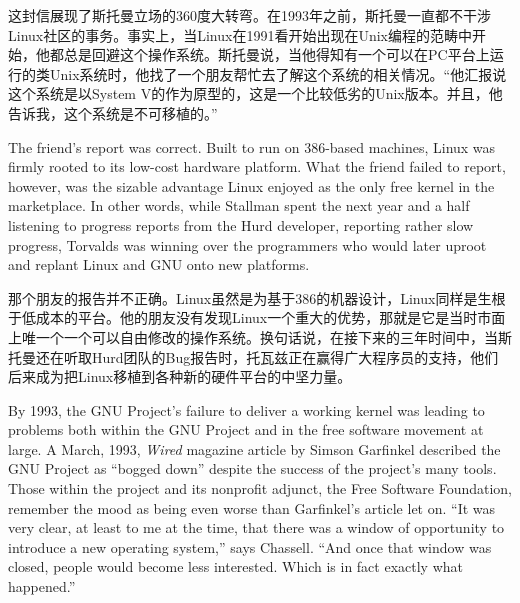 \ifdefined\chs
这封信展现了斯托曼立场的360度大转弯。在1993年之前，斯托曼一直都不干涉Linux社区的事务。事实上，当Linux在1991看开始出现在Unix编程的范畴中开始，他都总是回避这个操作系统。斯托曼说，当他得知有一个可以在PC平台上运行的类Unix系统时，他找了一个朋友帮忙去了解这个系统的相关情况。``他汇报说这个系统是以System V的作为原型的，这是一个比较低劣的Unix版本。并且，他告诉我，这个系统是不可移植的。''
\fi

\ifdefined\eng
The friend's report was correct. Built to run on 386-based machines, Linux was firmly rooted to its low-cost hardware platform. What the friend failed to report, however, was the sizable advantage Linux enjoyed as the only free kernel in the marketplace. In other words, while Stallman spent the next year and a half listening to progress reports from the Hurd developer, reporting rather slow progress, Torvalds was winning over the programmers who would later uproot and replant Linux and GNU onto new platforms.
\fi

\ifdefined\chs
那个朋友的报告并不正确。Linux虽然是为基于386的机器设计，Linux同样是生根于低成本的平台。他的朋友没有发现Linux一个重大的优势，那就是它是当时市面上唯一个一个可以自由修改的操作系统。换句话说，在接下来的三年时间中，当斯托曼还在听取Hurd团队的Bug报告时，托瓦兹正在赢得广大程序员的支持，他们后来成为把Linux移植到各种新的硬件平台的中坚力量。
\fi

\ifdefined\eng
By 1993, the GNU Project's failure to deliver a working kernel was leading to problems both within the GNU Project and in the free software movement at large. A March, 1993, \textit{Wired} magazine article by Simson Garfinkel described the GNU Project as ``bogged down'' despite the success of the project's many tools. Those within the project and its nonprofit adjunct, the Free Software Foundation, remember the mood as being even worse than Garfinkel's article let on. ``It was very clear, at least to me at the time, that there was a window of opportunity to introduce a new operating system,'' says Chassell. ``And once that window was closed, people would become less interested. Which is in fact exactly what happened.''
\fi

